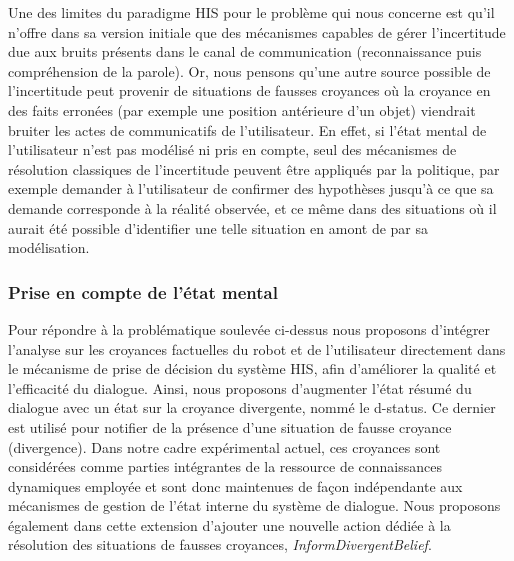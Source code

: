 \documentclass[a4paper,11pt,twoside]{StyleThese}
\begin{document}
Une des limites du paradigme HIS pour le problème qui nous concerne est qu’il
n’offre dans sa version initiale que des mécanismes capables de gérer l’incertitude due
aux bruits présents dans le canal de communication (reconnaissance puis compréhension
de la parole). Or, nous pensons qu’une autre source possible de l’incertitude peut
provenir de situations de fausses croyances où la croyance en des faits erronées (par
exemple une position antérieure d’un objet) viendrait bruiter les actes de communicatifs
de l’utilisateur. En effet, si l’état mental de l’utilisateur n’est pas modélisé ni pris
en compte, seul des mécanismes de résolution classiques de l’incertitude peuvent être
appliqués par la politique, par exemple demander à l’utilisateur de confirmer des hypothèses
jusqu’à ce que sa demande corresponde à la réalité observée, et ce même dans
des situations où il aurait été possible d’identifier une telle situation en amont de par
sa modélisation.




\subsubsection{Prise en compte de l'état mental}
\label{sec:mentalStateDial}
Pour répondre à la problématique soulevée ci-dessus nous proposons d'intégrer l’analyse sur les
croyances factuelles du robot et de l’utilisateur directement dans le mécanisme de prise
de décision du système HIS, afin d'améliorer la qualité et l’efficacité du dialogue. Ainsi, nous proposons d’augmenter l’état résumé du dialogue avec un état sur la croyance divergente, nommé le
d-status. Ce dernier est utilisé pour notifier de la présence d’une situation de fausse
croyance (divergence).
Dans notre cadre expérimental actuel, ces croyances sont considérées comme parties
intégrantes de la ressource de connaissances dynamiques employée et sont donc maintenues de façon indépendante aux mécanismes de gestion de l’état interne du système
de dialogue. Nous proposons également dans cette extension d’ajouter une nouvelle
action dédiée à la résolution des situations de fausses croyances, \textit{InformDivergentBelief}.
\end{document}
